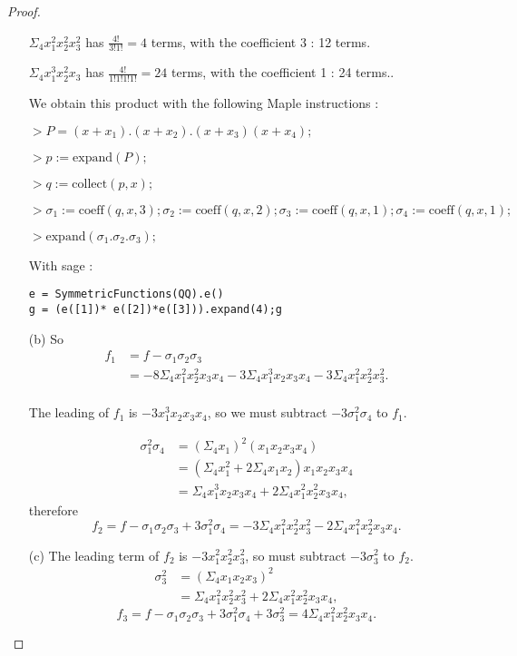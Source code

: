 \documentclass[11pt,a4paper]{article}
\begin{document}
\begin{proof}
\begin{enumerate}
$\Sigma_4x_1^2x_2^2x_3^2$ has $\frac{4!}{3!1!} = 4$ terms,  with the coefficient 3 : 12 terms.

$\Sigma_4x_1^3x_2^2x_3$ has $\frac{4!}{1!1!1!1!} = 24$ terms,  with the coefficient 1 : 24 terms..

We obtain this product with the following Maple instructions :

$> P = (x+x_1).(x+x_2).(x+x_3)(x+x_4);$

$> p:=\mathrm{expand}(P);$

$> q:=\mathrm{collect}(p,x);$

$> \sigma_1:=\mathrm{coeff}(q,x,3); \sigma_2:=\mathrm{coeff}(q,x,2);\sigma_3:=\mathrm{coeff}(q,x,1);\sigma_4:=\mathrm{coeff}(q,x,1);$

$> \mathrm{expand}(\sigma_1.\sigma_2.\sigma_3);$

With sage :
\begin{verbatim}
e = SymmetricFunctions(QQ).e()
g = (e([1])* e([2])*e([3])).expand(4);g
\end{verbatim}
\item[(b)]
So
\begin{align*}
f_1 &= f - \sigma_1\sigma_2\sigma_3\\
&=-8\Sigma_4 x_1^2x_2^2x_3x_4-3\Sigma_4x_1^3x_2x_3x_4-3\Sigma_4x_1^2x_2^2x_3^2.\\
\end{align*}

The leading  of $f_1$ is $-3x_1^3x_2x_3x_4$, so we must subtract  $-3 \sigma_1^2 \sigma_4$ to $f_1$.

\begin{align*}
\sigma_1^2\sigma_4&=(\Sigma_4 x_1)^2  (x_1x_2x_3x_4)\\
&=(\Sigma_4 x_1^2 + 2 \Sigma_4 x_1x_2)x_1x_2x_3x_4\\
&= \Sigma_4 x_1^3x_2x_3x_4 + 2 \Sigma_4 x_1^2x_2^2x_3x_4,
\end{align*}
therefore $$f_2 = f - \sigma_1\sigma_2\sigma_3 +3 \sigma_1^2 \sigma_4  = -3\Sigma_4x_1^2x_2^2x_3^2-2\Sigma_4 x_1^2x_2^2x_3x_4.$$


\item[(c)] The leading term of $f_2$ is $-3x_1^2x_2^2x_3^2$, so must subtract  $-3\sigma_3^2$  to $f_2$.
\begin{align*}
\sigma_3^2&=(\Sigma_4 x_1x_2x_3)^2\\
&= \Sigma_4 x_1^2x_2^2x_3^2 + 2 \Sigma_4 x_1^2x_2^2x_3x_4,
\end{align*}
$$f_3 = f - \sigma_1\sigma_2\sigma_3 +3 \sigma_1^2 \sigma_4 +3\sigma_3^2 = 4 \Sigma_4 x_1^2x_2^2x_3x_4.$$


\end{enumerate}
\end{proof}
\end{document}
